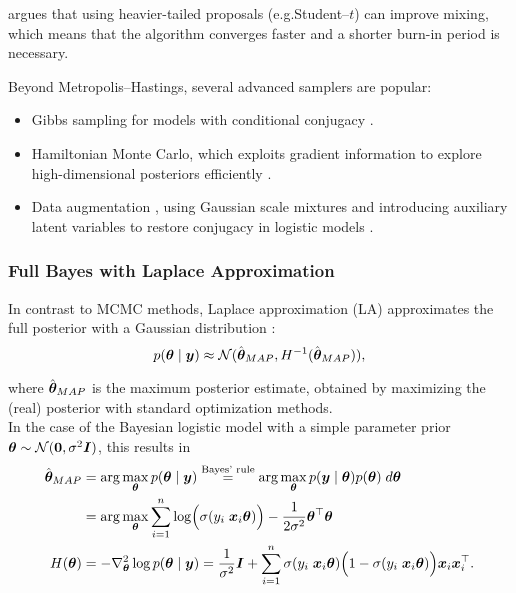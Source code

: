 \citep{scott_data_2011} argues that using heavier-tailed proposals (e.g.\@ Student–$t$) can improve mixing, which means that the algorithm converges faster and a shorter burn-in period is necessary.\\


Beyond Metropolis–Hastings, several advanced samplers are popular:

\begin{itemize}
    \item Gibbs sampling for models with conditional conjugacy \citep{dellaportas_bayesian_1993}.
    \item Hamiltonian Monte Carlo, which exploits gradient information to explore high-dimensional posteriors efficiently \citep{neal_probabilistic_1993}.
    \item Data augmentation \citep{albert_bayesian_1993}, using Gaussian scale mixtures and introducing auxiliary latent variables to restore conjugacy in logistic models \citep{holmes_efficient_nodate,fruhwirth-schnatter_auxiliary_2007,scott_data_2011}.
\end{itemize}

\subsubsection*{Full Bayes with Laplace Approximation}

In contrast to MCMC methods, Laplace approximation (LA) approximates the full posterior with a Gaussian distribution \citep{tierney_accurate_1986}:
\begin{equation*}
    p(\bm{\theta} \mid \bm{y}) \approx \mathcal{N}(\hat{\bm{\theta}}_{MAP}, H^{-1}(\hat{\bm{\theta}}_{MAP})),
\end{equation*}

where $\hat{\bm{\theta}}_{MAP}$ is the maximum posterior estimate, obtained by maximizing the (real) posterior with standard optimization methods.\\

In the case of the Bayesian logistic model with a simple parameter prior $\bm{\theta} \sim \mathcal{N}(\bm{0}, \sigma^2 \bm{I})$, this results in
\begin{equation*}
    \begin{aligned}
        \hat{\bm{\theta}}_{MAP} &= \arg \max_{\bm{\theta}} p(\bm{\theta} \mid \bm{y})
            \overset{\text{Bayes' rule}}{=} \arg \max_{\bm{\theta}} p(\bm{y} \mid \bm{\theta}) p(\bm{\theta}) \; d\bm{\theta}  \\
            &= \arg \max_{\bm{\theta}} \sum_{i = 1}^n \log \Bigl( \sigma(y_i \; \bm{x}_i\bm{\theta})\Bigr) - \frac{1}{2 \sigma^2} \bm{\theta}^\top \bm{\theta} \\
        H(\bm{\theta}) &= - \nabla^2_{\bm{\theta}}  \log p (\bm{\theta} \mid \bm{y}) = \frac{1}{\sigma^2} \bm{I} + \sum_{i = 1}^n
        \sigma(y_i \; \bm{x}_i\bm{\theta}) \Bigl(1 - \sigma(y_i \; \bm{x}_i\bm{\theta})\Bigr)
            \bm{x}_i \bm{x}_i^\top.
    \end{aligned}
\end{equation*}

